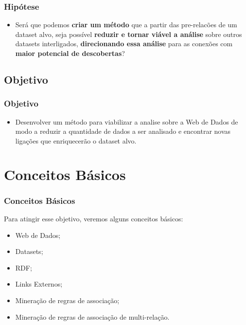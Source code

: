 \documentclass[hyperref={pdfpagelabels=false}]{beamer}
\begin{document}
\begin{frame}
	\frametitle{Hipótese}
	
		\begin{itemize}
	 \item Será que podemos \textbf{criar um método} que a partir das pre-relacões de um dataset alvo, seja possível \textbf{reduzir e tornar viável a análise} sobre outros datasets interligados, \textbf{direcionando essa análise} para as conexões com \textbf{maior potencial de descobertas}?
	

	\end{itemize}		
\end{frame}


\subsection{Objetivo}
 
\begin{frame}
	\frametitle{Objetivo}
		\begin{itemize}
	    \item Desenvolver um método para viabilizar a analise sobre a Web de Dados de modo a reduzir a quantidade de dados a ser analisado e encontrar novas ligações que enriquecerão o dataset alvo. 
	\end{itemize}		
\end{frame}

\section{Conceitos Básicos}

\begin{frame}
\frametitle{Conceitos Básicos}
Para atingir esse objetivo, veremos alguns conceitos básicos:
\begin{itemize}
  \item Web de Dados;
  \item Datasets;
  \item RDF;
  \item Links Externos;
  \item Mineração de regras de associação;
  \item Mineração de regras de associação de multi-relação.
 
\end{itemize}
\end{frame}
\end{document}

